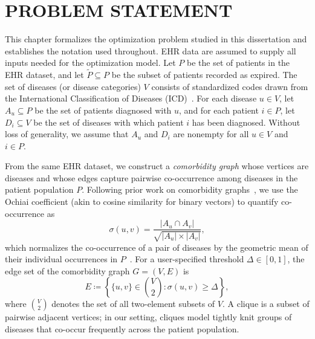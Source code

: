 \begingroup
\clearpage
\let\clearpage\relax
\vspace*{-16pt}
\chapter[PROBLEM STATEMENT]{PROBLEM STATEMENT}\label{sec.probstmnt}
\endgroup


This chapter formalizes the optimization problem studied in this
dissertation and establishes the notation used throughout. EHR data
are assumed to supply all inputs needed for the optimization model.
Let $P$ be the set of patients in the EHR dataset, and let
$\widetilde{P} \subseteq P$ be the subset of patients recorded as
expired. The set of diseases (or disease categories) $V$ consists of
standardized codes drawn from the International Classification of
Diseases (ICD)~\citep{cdc_icd9cm_2013, cdc_icd10cm_2022}. For each
disease $u \in V$, let $A_u \subseteq P$ be the set of patients
diagnosed with $u$, and for each patient $i \in P$, let
$D_i \subseteq V$ be the set of diseases with which patient $i$ has
been diagnosed. Without loss of generality, we assume that $A_u$ and
$D_i$ are nonempty for all $u \in V$ and $i \in P$.

From the same EHR dataset, we construct a \textit{comorbidity graph}
whose vertices are diseases and whose edges capture pairwise
co-occurrence among diseases in the patient population $P$. Following
prior work on comorbidity
graphs~\citep{KALGOTRA2020,VaghfiMohebbi2025lethalclique}, we use the
Ochiai coefficient (akin to cosine similarity for binary vectors) to
quantify co-occurrence as
\begin{equation}
    \label{eq.SCI}
    \sigma(u,v) = \frac{|A_u \cap A_v|}{\sqrt{|A_u| \times |A_v|}},
\end{equation}
which normalizes the co-occurrence of a pair of diseases by the
geometric mean of their individual occurrences in
$P$~\citep{ochiai1957zoogeographic,Salton}. For a
user-specified threshold $\Delta \in [0,1]$, the edge set of the
comorbidity graph $G=(V,E)$ is
\begin{equation}
    E \coloneqq \left\{ \{u,v\} \in \binom{V}{2} :
        \sigma(u,v) \ge \Delta \right\},
\end{equation}
where $\binom{V}{2}$ denotes the set of all two-element subsets of
$V$. A clique is a subset of pairwise adjacent vertices; in our
setting, cliques model tightly knit groups of diseases that co-occur
frequently across the patient population.

